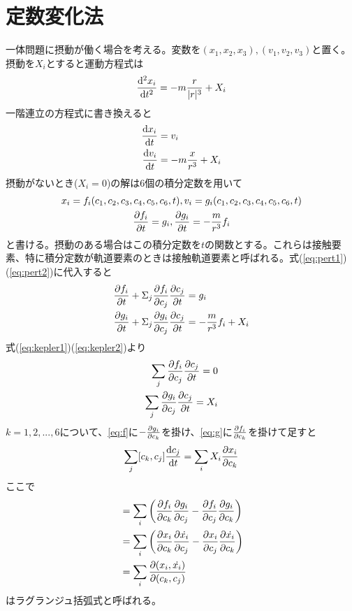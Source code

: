 
\section{定数変化法}
	一体問題に摂動が働く場合を考える。変数を$(x_1,x_2,x_3),(v_1,v_2,v_3)$と置く。摂動を$X_i$とすると運動方程式は
		\[\de[^2x_i]{t^2} = - m\frac{r}{|r|^3} + X_i\]
	一階連立の方程式に書き換えると
	\begin{align}
		\de[x_i]{t} &= v_i \label{eq:pert1}\\
		\de[v_i]{t} &= -m\frac{x}{r^3} + X_i \label{eq:pert2}
	\end{align}
	摂動がないとき($X_i = 0$)の解は6個の積分定数を用いて
	\begin{gather}
		x_i = f_i(c_1,c_2,c_3,c_4,c_5,c_6,t), v_i = g_i(c_1,c_2,c_3,c_4,c_5,c_6,t) \label{eq:kepler1}\\
		\pd[f_i]{t} = g_i, \pd[g_i]{t} = - \frac{m}{r^3}f_i \label{eq:kepler2}\\
	\end{gather}
	と書ける。摂動のある場合はこの積分定数を$t$の関数とする。これらは接触要素、特に積分定数が軌道要素のときは接触軌道要素と呼ばれる。式(\ref{eq:pert1})(\ref{eq:pert2})に代入すると
	\begin{align*}
		\pd[f_i]{t} + \Sigma_{j} \pd[f_i]{c_j}\pd[c_j]{t} &= g_i\\
		\pd[g_i]{t} + \Sigma_{j} \pd[g_i]{c_j}\pd[c_j]{t} &= - \frac{m}{r^3}f_i + X_i\\
	\end{align*}
    式(\ref{eq:kepler1})(\ref{eq:kepler2})より
	\begin{align}
		\sum_{j} \pd[f_i]{c_j}\pd[c_j]{t} = 0 \label{eq:f}\\
		\sum_{j} \pd[g_i]{c_j}\pd[c_j]{t} = \label{eq:g}X_i\\
	\end{align}
	$k = 1,2,...,6$について、\ref{eq:f}に$-\pd[g_i]{c_k}$を掛け、\ref{eq:g}に$\pd[f_i]{c_k}$を掛けて足すと
		\[\sum_{j} [c_k, c_j]\de[c_j]{t} = \sum_{i} X_i\pd[x_i]{c_k} \label{eq:basic}\]
	ここで
	\begin{align*}
		[c_k, c_j] &= \sum_{i}\lr{ \pd[f_i]{c_k}\pd[g_i]{c_j} - \pd[f_i]{c_j}\pd[g_i]{c_k} }\\
		&= \sum_{i}\lr{ \pd[x_i]{c_k}\pd[\dot{x_i}]{c_j} - \pd[x_i]{c_j}\pd[\dot{x_i}]{c_k} }\\
		&= \sum_{i} \pd[(x_i, \dot{x_i})]{(c_k, c_j)}
	\end{align*}
	はラグランジュ括弧式と呼ばれる。

